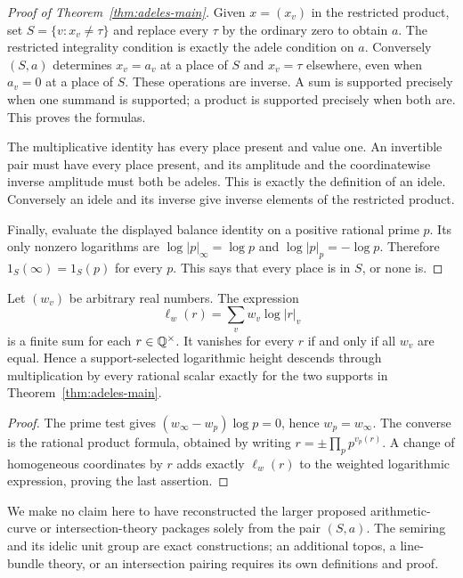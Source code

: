 \documentclass[11pt]{article}
\theoremstyle{definition}\newtheorem{definition}[theorem]{Definition}
\begin{document}
\begin{proof}[Proof of Theorem~\ref{thm:adeles-main}]
Given $x=(x_v)$ in the restricted product, set $S=\{v:x_v\ne\tau\}$ and replace every $\tau$ by the ordinary zero to obtain $a$. The restricted integrality condition is exactly the adele condition on $a$. Conversely $(S,a)$ determines $x_v=a_v$ at a place of $S$ and $x_v=\tau$ elsewhere, even when $a_v=0$ at a place of $S$. These operations are inverse. A sum is supported precisely when one summand is supported; a product is supported precisely when both are. This proves the formulas.

The multiplicative identity has every place present and value one. An invertible pair must have every place present, and its amplitude and the coordinatewise inverse amplitude must both be adeles. This is exactly the definition of an idele. Conversely an idele and its inverse give inverse elements of the restricted product.

Finally, evaluate the displayed balance identity on a positive rational prime $p$. Its only nonzero logarithms are $\log|p|_\infty=\log p$ and $\log|p|_p=-\log p$. Therefore $1_S(\infty)=1_S(p)$ for every $p$. This says that every place is in $S$, or none is.
\end{proof}

\begin{proposition}\label{prop:weights}
Let $(w_v)$ be arbitrary real numbers. The expression
\[
 \ell_w(r)=\sum_v w_v\log|r|_v
\]
is a finite sum for each $r\in\mathbb Q^\times$. It vanishes for every $r$ if and only if all $w_v$ are equal. Hence a support-selected logarithmic height descends through multiplication by every rational scalar exactly for the two supports in Theorem~\ref{thm:adeles-main}.
\end{proposition}
\begin{proof}
The prime test gives $(w_\infty-w_p)\log p=0$, hence $w_p=w_\infty$. The converse is the rational product formula, obtained by writing $r=\pm\prod_pp^{v_p(r)}$. A change of homogeneous coordinates by $r$ adds exactly $\ell_w(r)$ to the weighted logarithmic expression, proving the last assertion.
\end{proof}



We make no claim here to have reconstructed the larger proposed arithmetic-curve or intersection-theory packages solely from the pair $(S,a)$. The semiring and its idelic unit group are exact constructions; an additional topos, a line-bundle theory, or an intersection pairing requires its own definitions and proof.
\end{document}
